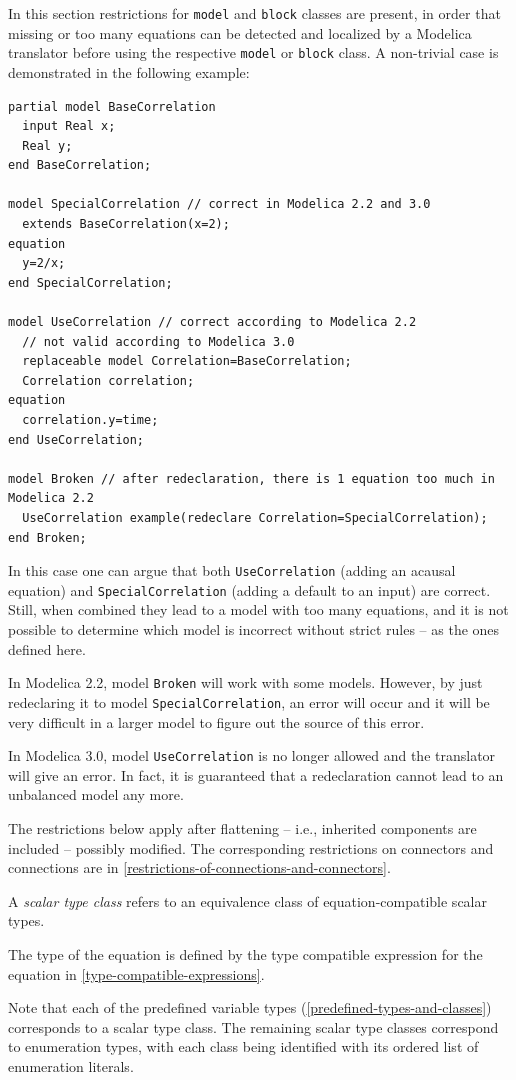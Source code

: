 \begin{nonnormative}
In this section restrictions for \lstinline!model! and \lstinline!block! classes are present, in order that missing or too many equations can be detected and localized by a Modelica translator before using the respective \lstinline!model! or \lstinline!block! class.
A non-trivial case is demonstrated in the following example:
\begin{lstlisting}[language=modelica]
partial model BaseCorrelation
  input Real x;
  Real y;
end BaseCorrelation;

model SpecialCorrelation // correct in Modelica 2.2 and 3.0
  extends BaseCorrelation(x=2);
equation
  y=2/x;
end SpecialCorrelation;

model UseCorrelation // correct according to Modelica 2.2
  // not valid according to Modelica 3.0
  replaceable model Correlation=BaseCorrelation;
  Correlation correlation;
equation
  correlation.y=time;
end UseCorrelation;

model Broken // after redeclaration, there is 1 equation too much in Modelica 2.2
  UseCorrelation example(redeclare Correlation=SpecialCorrelation);
end Broken;
\end{lstlisting}

In this case one can argue that both \lstinline!UseCorrelation! (adding an acausal equation) and \lstinline!SpecialCorrelation! (adding a default to an input) are correct.
Still, when combined they lead to a model with too many equations, and it is not possible to determine which model is incorrect without strict rules -- as the ones defined here.

In Modelica 2.2, model \lstinline!Broken! will work with some models.
However, by just redeclaring it to model \lstinline!SpecialCorrelation!, an error will occur and it will be very difficult in a larger model to figure out the source of this error.

In Modelica 3.0, model \lstinline!UseCorrelation! is no longer allowed and the translator will give an error.
In fact, it is guaranteed that a redeclaration cannot lead to an unbalanced model any more.
\end{nonnormative}

The restrictions below apply after flattening -- i.e., inherited components are included -- possibly modified.
The corresponding restrictions on connectors and connections are in \cref{restrictions-of-connections-and-connectors}.

\begin{definition}
A \emph{scalar type class} refers to an equivalence class of equation-compatible scalar types.

The type of the equation is defined by the type compatible expression for the equation in \cref{type-compatible-expressions}.

Note that each of the predefined variable types (\cref{predefined-types-and-classes}) corresponds to a scalar type class.
The remaining scalar type classes correspond to enumeration types, with each class being identified with its ordered list of enumeration literals.
\end{definition}

